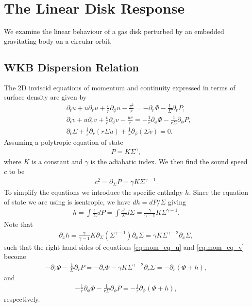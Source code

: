 \section{The Linear Disk Response}

We examine the linear behaviour of a gas disk perturbed by an embedded gravitating body on a circular orbit.

\subsection{WKB Dispersion Relation}

The 2D inviscid equations of momentum and continuity expressed in terms of surface density are given by 
\begin{align}
    &\partial_t u + u \partial_r u + \frac{v}{r} \partial_\phi u - \frac{v^2}{r} = - \partial_r \Phi - \frac{1}{\Sigma} \partial_r P, \label{eq:mom_eq_u} \\ 
    &\partial_t v + u \partial_r v + \frac{v}{r} \partial_\phi v - \frac{uv}{r} = - \frac{1}{r} \partial_\phi \Phi - \frac{1}{r\Sigma} \partial_\phi P, \label{eq:mom_eq_v} \\
    &\partial_t \Sigma + \frac{1}{r} \partial_r (r \Sigma u) + \frac{1}{r} \partial_\phi (\Sigma v) = 0. 
    \label{eq:cont_2d}
\end{align}
Assuming a polytropic equation of state
\begin{align}
    P = K \Sigma^\gamma,
\end{align}
where $K$ is a constant and $\gamma$ is the adiabatic index. We then find the sound speed $c$ to be
\begin{align}
    c^2 = \partial_\Sigma P = \gamma K \Sigma^{\gamma-1}. \label{eq:cs_poly}
\end{align}
To simplify the equations we introduce the specific enthalpy $h$. Since the equation of state we are using is isentropic, we have $dh = dP / \Sigma$ giving
\begin{align}
    h = \int \frac{1}{\Sigma} dP = \int \frac{c^2}{\Sigma} d\Sigma = \frac{\gamma}{\gamma-1} K \Sigma^{\gamma-1}. \label{eq:enthalpy}
\end{align}
Note that
\begin{align}
    \partial_x h = \frac{\gamma}{\gamma - 1} K \partial_\Sigma (\Sigma^{\gamma-1}) \partial_x \Sigma = \gamma K \Sigma^{\gamma-2} \partial_x \Sigma,
\end{align}
such that the right-hand sides of equations \ref{eq:mom_eq_u} and \ref{eq:mom_eq_v} become
\begin{align}
    - \partial_r \Phi - \frac{1}{\Sigma} \partial_r P = - \partial_r \Phi - \gamma K \Sigma^{\gamma-2} \partial_r \Sigma = - \partial_r (\Phi + h) \label{eq:mom_u_RHS},
\end{align}
and
\begin{align}
    - \frac{1}{r} \partial_\phi \Phi - \frac{1}{r\Sigma} \partial_\phi P = - \frac{1}{r} \partial_\phi (\Phi + h) \label{eq:mom_v_RHS},
\end{align}
respectively.

